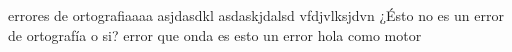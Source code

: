 errores de ortografiaaaa asjdasdkl asdaskjdalsd vfdjvlksjdvn
¿Ésto no es un error de ortografía o si? error que onda es esto un error hola como motor 